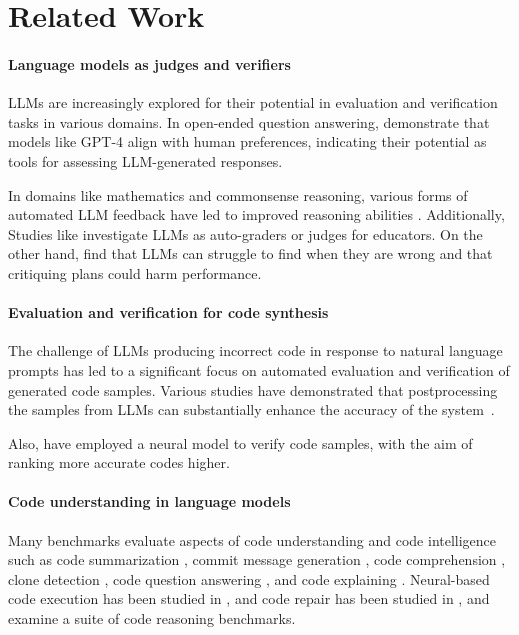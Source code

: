 \section{Related Work}
\paragraph{Language models as judges and verifiers}
LLMs are increasingly explored for their potential in evaluation and verification tasks in various domains. In open-ended question answering, \citet{zheng2023judging} demonstrate that models like GPT-4 align with human preferences, indicating their potential as tools for assessing LLM-generated responses. 

In domains like mathematics and commonsense reasoning, various forms of automated LLM feedback have led to improved reasoning abilities \citep{cobbe2021training, zhou2023solving, weng2022large, lightman2023let, chen2023universal,wang2023math,shao2024deepseekmath}. 
Additionally, Studies like \citep{schneider2023towards, matelsky2023large} investigate LLMs as auto-graders or judges for educators.
On the other hand, \citet{valmeekam2023can, tyen2023llms, stechly2023gpt, chen2024tree} find that LLMs can struggle to find when they are wrong and that critiquing plans could harm performance.

\paragraph{Evaluation and verification for code synthesis}
The challenge of LLMs producing incorrect code in response to natural language prompts has led to a significant focus on automated evaluation and verification of generated code samples. Various studies have demonstrated that postprocessing the samples from LLMs can substantially enhance the accuracy of the system~\citep{chen2022codet, ridnik2024code, key2022speak, zhang2023algo, li2022competition, huang2023enhancing}.

Also, \citet{inala2022fault,zhang2023coder,ni2023lever} have employed a neural model to verify code samples, with the aim of ranking more accurate codes higher.

\paragraph{Code understanding in language models}
Many benchmarks evaluate aspects of code understanding and code intelligence such as code summarization \citep{iyer2016summarizing, hasan2021codesc}, commit message generation \citep{liu2020atom}, code comprehension \citep{singhal2024nofuneval}, clone detection \citep{lu2021codexglue}, code question answering \citep{sahu2022learning}, and code explaining \citep{muennighoff2023octopack}. Neural-based code execution has been studied in \citep{austin2021program, nye2021show, gu2024cruxeval, la2024code}, and code repair has been studied in \citep{madaan2023self, chen2024teaching, zhang2023self, olausson2024repair}, and \citet{liu2024codemind} examine a suite of code reasoning benchmarks.

